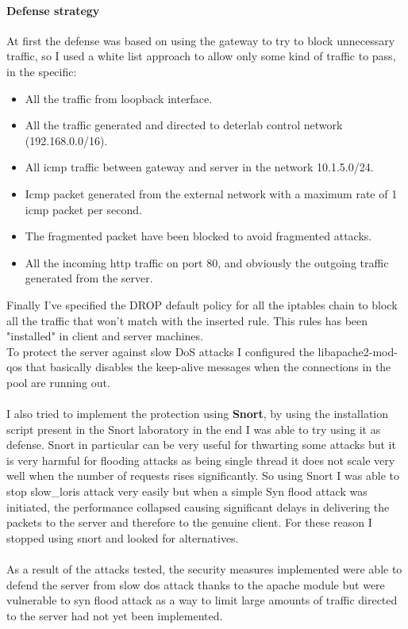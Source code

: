\documentclass[14pt]{article}
\begin{document}
\paragraph{Defense strategy}
At first the defense was based on using the gateway to try to block unnecessary traffic, so I used a white list approach to allow only some kind of traffic to pass, in the specific:
\begin{itemize}
	\item All the traffic from loopback interface.
	\item All the traffic generated and directed to deterlab control network (192.168.0.0/16).
	\item All icmp traffic between gateway and server in the network 10.1.5.0/24.
	\item Icmp packet generated from the external network with a maximum rate of 1 icmp packet per second.
	\item The fragmented packet have been blocked to avoid fragmented attacks.
	\item All the incoming http traffic on port 80, and obviously the outgoing traffic generated from the server.
\end{itemize}
Finally I've specified the DROP default policy for all the iptables chain to block all the traffic that won't match with the inserted rule. This rules has been "installed" in client and server machines.
\\
To protect the server against slow DoS attacks I configured the libapache2-mod-qos that basically disables the keep-alive messages when the connections in the pool are running out.
\\
\\
I also tried to implement the protection using \textbf{Snort}, by using the installation script present in the Snort laboratory in the end I was able to try using it as defense. Snort in particular can be very useful for thwarting some attacks but it is very harmful for flooding attacks as being single thread it does not scale very well when the number of requests rises significantly. So using Snort I was able to stop slow\_loris attack very easily but when a simple Syn flood attack was initiated, the performance collapsed causing significant delays in delivering the packets to the server and therefore to the genuine client. For these reason I stopped using snort and looked for alternatives.
\\
\\
As a result of the attacks tested, the security measures implemented were able to defend the server from slow dos attack thanks to the apache module but were vulnerable to syn flood attack as a way to limit large amounts of traffic directed to the server had not yet been implemented.
\end{document}
